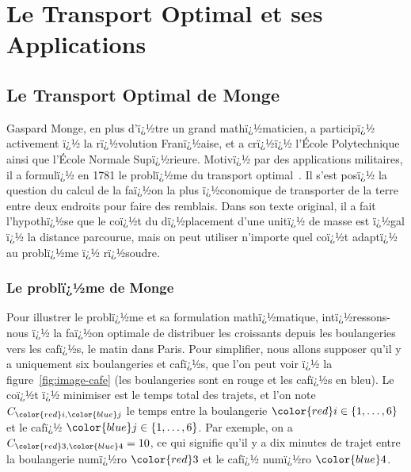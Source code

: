 

\newcommand{\Blu}[1]{{\color{blue}#1}}
\newcommand{\Red}[1]{{\color{red}#1}}
\newcommand{\iC}{\Red{i}}
\newcommand{\jC}{\Blu{j}}
\newcommand{\aC}{\Red{a}}
\newcommand{\bC}{\Blu{b}}


\ifdefined\otarticle
\newcommand{\myparagraph}[1]{\subsection{#1}}
\else
\newcommand{\myparagraph}[1]{\paragraph{#1}}
\chapter{Le Transport Optimal et ses Applications}
\fi

\label{chap-ot}


\section{Le Transport Optimal de Monge}

Gaspard Monge, en plus d'ï¿½tre un grand mathï¿½maticien, a participï¿½ activement ï¿½ la rï¿½volution Franï¿½aise, et a crï¿½ï¿½ l'\'Ecole Polytechnique ainsi que l'\'Ecole Normale Supï¿½rieure. Motivï¿½ par des applications militaires, il a formulï¿½ en 1781 le problï¿½me du transport optimal~\cite{Monge1781}. Il s'est posï¿½ la question du calcul de la faï¿½on la plus ï¿½conomique de transporter de la terre entre deux endroits pour faire des remblais. Dans son texte original, il a fait l'hypothï¿½se que le coï¿½t du dï¿½placement d'une unitï¿½ de masse est ï¿½gal ï¿½ la distance parcourue, mais on peut utiliser n'importe quel coï¿½t adaptï¿½ au problï¿½me ï¿½ rï¿½soudre. 

\myparagraph{Le problï¿½me de Monge}

Pour illustrer le problï¿½me et sa formulation mathï¿½matique, intï¿½ressons-nous ï¿½ la faï¿½on optimale de distribuer les croissants depuis les boulangeries vers les cafï¿½s, le matin dans Paris. Pour simplifier, nous allons supposer qu'il y a uniquement six boulangeries et cafï¿½s, que l'on peut voir ï¿½ la figure~\ref{fig:image-cafe} (les boulangeries sont en \Red{rouge} et les cafï¿½s en \Blu{bleu}). Le coï¿½t ï¿½ minimiser est le temps total des trajets, et l'on note $C_{\iC,\jC}$ le temps entre la boulangerie $\iC \in \{1,\ldots,6\}$  et le cafï¿½ $\jC \in \{1,\ldots,6\}$. Par exemple, on a $C_{\Red{3},\Blu{4}}=10$, ce qui signifie qu'il y a dix minutes de trajet entre la boulangerie numï¿½ro $\Red{3}$ et le cafï¿½ numï¿½ro $\Blu{4}$. 

